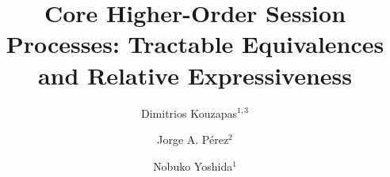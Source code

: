 \documentclass[runningheads,envcountsect,orivec]{llncs}
\begin{document}


\title {
	Core Higher-Order Session Processes:
	Tractable Equivalences and Relative Expressiveness
}\titlerunning{\today}\authorrunning{\today}
\author{
	Dimitrios Kouzapas${}^{1,3}$
        \and 
        Jorge A. P\'{e}rez${}^2$ 
	\and
	Nobuko Yoshida${}^1$
}
\maketitle
%







%




%













%

%

%






\appendix




%

%
%
%
\end{document}
